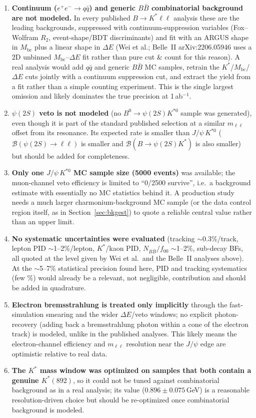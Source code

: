 \documentclass[11pt]{article}
\newcommand{\BF}{\mathcal{B}}
\newcommand{\Kst}{K^{*0}}
\newcommand{\Mbc}{M_{\mathrm{bc}}}
\newcommand{\dE}{\Delta E}
\newcommand{\mll}{m_{\ell\ell}}
\newcommand{\jpsi}{J/\psi}
\begin{document}
\begin{enumerate}
\item \textbf{Continuum ($e^+e^-\to q\bar q$) and generic $B\bar B$
  combinatorial background are not modeled.} In every published
  $B\to K^{*}\ell\ell$ analysis these are the leading backgrounds,
  suppressed with continuum-suppression variables (Fox--Wolfram $R_2$,
  event-shape/BDT discriminants) and fit with an ARGUS shape in $\Mbc$
  plus a linear shape in $\dE$ (Wei et al.; Belle~II arXiv:2206.05946
  uses a 2D unbinned $\Mbc$--$\dE$ fit rather than pure cut \& count for
  this reason). A real analysis would add $q\bar q$ and generic
  $B\bar B$ MC samples, retrain the $K^{*}$/$\Mbc$/$\dE$ cuts jointly
  with a continuum suppression cut, and extract the yield from a fit
  rather than a simple counting experiment. This is the single largest
  omission and likely dominates the true precision at 1\,ab$^{-1}$.
\item \textbf{$\psi(2S)$ veto is not modeled} (no $B^0\to\psi(2S)\Kst$
  sample was generated), even though it is part of the standard
  published selection at a similar $\mll$ offset from its resonance. Its
  expected rate is smaller than $\jpsi\,\Kst$
  ($\BF(\psi(2S)\to\ell\ell)$ is smaller and $\BF(B\to\psi(2S)K^{*})$ is
  also smaller) but should be added for completeness.
\item \textbf{Only one $\jpsi\,\Kst$ MC sample size (5000 events)} was
  available; the muon-channel veto efficiency is limited to ``0/2500
  survive'', i.e.\ a background estimate with essentially no MC
  statistics behind it. A production study needs a much larger
  charmonium-background MC sample (or the data control region itself, as
  in Section~\ref{sec:bkgest}) to quote a reliable central value rather
  than an upper limit.
\item \textbf{No systematic uncertainties were evaluated} (tracking
  $\sim$0.3\%/track, lepton PID $\sim$1--2\%/lepton, $K^{*}$/kaon PID,
  $N_{B\bar B}/f_{00}$ $\sim$1--2\%, sub-decay BFs, all quoted at the
  level given by Wei et al.\ and the Belle~II analyses above). At the
  $\sim$5--7\% statistical precision found here, PID and tracking
  systematics (few \%) would already be a relevant, not negligible,
  contribution and should be added in quadrature.
\item \textbf{Electron bremsstrahlung is treated only implicitly}
  through the fast-simulation smearing and the wider $\dE$/veto windows;
  no explicit photon-recovery (adding back a bremsstrahlung photon
  within a cone of the electron track) is modeled, unlike in the
  published analyses. This likely means the electron-channel efficiency
  and $\mll$ resolution near the $\jpsi$ edge are optimistic relative to
  real data.
\item \textbf{The $K^{*}$ mass window was optimized on samples that both
  contain a genuine $K^{*}(892)$}, so it could not be tuned against
  combinatorial background as in a real analysis; its value
  ($0.896 \pm 0.075$\,GeV) is a reasonable resolution-driven choice but
  should be re-optimized once combinatorial background is modeled.
\end{enumerate}
\end{document}

